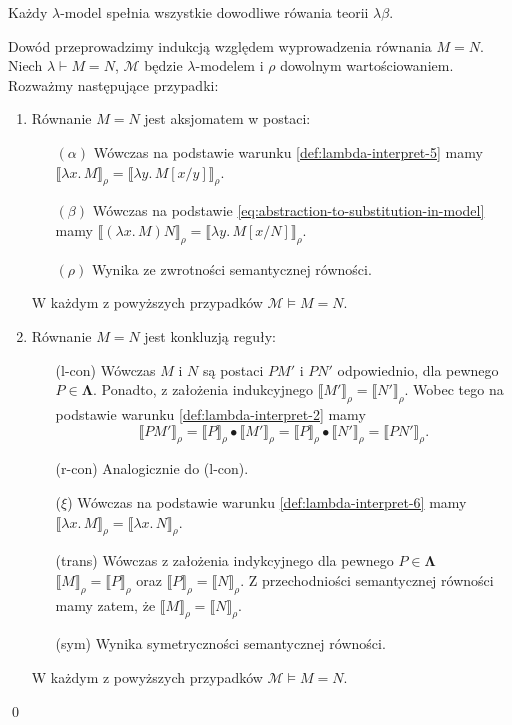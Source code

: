 \begin{twierdzenie}
  Każdy \(\lambda\)-model spełnia wszystkie dowodliwe rówania teorii \(\lambda\beta\).
\end{twierdzenie}
\begin{dowod}
  Dowód przeprowadzimy indukcją względem wyprowadzenia równania \(M=N\).
  Niech \(\lambda \vdash M=N\), \(\mathcal{M}\) będzie \(\lambda\)-modelem i \(\rho\) dowolnym wartościowaniem.
  Rozważmy następujące przypadki:
  \begin{enumerate}
    \setlength\itemsep{0em}
    \item Równanie \(M=N\) jest aksjomatem w postaci:  
      \begin{enumerate}
      \setlength\itemsep{0em}
        \item[\((\alpha)\)] Wówczas na podstawie warunku \ref{def:lambda-interpret-5} mamy
      \(\llbracket\lambda x.\,M\rrbracket_\rho = \llbracket \lambda y.\,M[x/y]\rrbracket_\rho\). 
        \item[\((\beta)\)] Wówczas na podstawie \eqref{eq:abstraction-to-substitution-in-model} mamy
          \(\llbracket(\lambda x.\,M)N\rrbracket_\rho = \llbracket \lambda y.\,M[x/N]\rrbracket_\rho\).
       \item[\((\rho)\)] Wynika ze zwrotności semantycznej równości.
      \end{enumerate}    
      W każdym z powyższych przypadków \(\mathcal{M}\models M=N\).
    \item Równanie \(M=N\) jest konkluzją reguły:
      \begin{enumerate}
      \setlength\itemsep{0em}
        \item[(l-con)] Wówczas \(M\) i \(N\) są postaci \(PM'\) i \(PN'\) odpowiednio, dla pewnego \(P\in\mathbf{\Lambda}\).
          Ponadto, z założenia indukcyjnego \(\llbracket M' \rrbracket_\rho=\llbracket N' \rrbracket_\rho\).
          Wobec tego na podstawie warunku \ref{def:lambda-interpret-2} mamy
          \[\llbracket PM'\rrbracket_\rho  =
            \llbracket P\rrbracket_\rho \bullet \llbracket M'\rrbracket_\rho =
            \llbracket P\rrbracket_\rho \bullet \llbracket N'\rrbracket_\rho =
            \llbracket PN'\rrbracket_\rho.\]
        \item[(r-con)] Analogicznie do (l-con).
        \item[(\(\xi\))] Wówczas na podstawie warunku \ref{def:lambda-interpret-6} mamy
          \(\llbracket \lambda x.\,M \rrbracket_\rho=\llbracket \lambda x.\,N\rrbracket_\rho\).
        \item[(trans)]
          Wówczas z założenia indykcyjnego dla pewnego \(P\in\mathbf{\Lambda}\)
          \(\llbracket M \rrbracket_\rho = \llbracket P \rrbracket_\rho\) oraz
          \(\llbracket P \rrbracket_\rho=\llbracket N \rrbracket_\rho\).
          Z przechodniości semantycznej równości mamy zatem, że \( \llbracket M \rrbracket_\rho=\llbracket N \rrbracket_\rho\).
        \item[(sym)] Wynika symetryczności semantycznej równości.
      \end{enumerate}
    W każdym z powyższych przypadków \(\mathcal{M}\models M=N\).
  \end{enumerate}
  \qed
\end{dowod}
  
